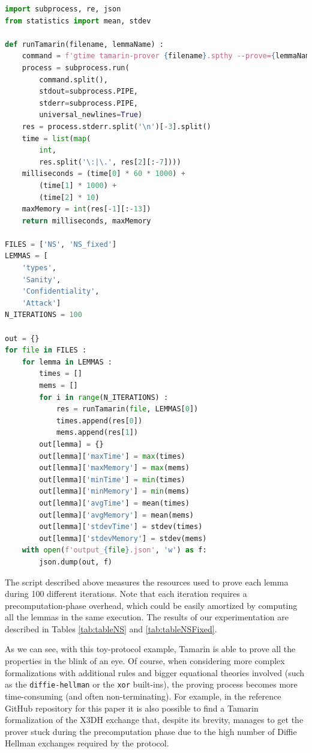 \documentclass[fleqn,10pt]{SelfArx} %
\begin{document}
\begin{lstlisting}[language=Python]
import subprocess, re, json
from statistics import mean, stdev

def runTamarin(filename, lemmaName) :
    command = f'gtime tamarin-prover {filename}.spthy --prove={lemmaName}'
    process = subprocess.run(
        command.split(),
        stdout=subprocess.PIPE,
        stderr=subprocess.PIPE,
        universal_newlines=True)
    res = process.stderr.split('\n')[-3].split()
    time = list(map(
        int,
        res.split('\:|\.', res[2][:-7])))
    milliseconds = (time[0] * 60 * 1000) +
        (time[1] * 1000) +
        (time[2] * 10)
    maxMemory = int(res[-1][:-13])
    return milliseconds, maxMemory

FILES = ['NS', 'NS_fixed']
LEMMAS = [
    'types',
    'Sanity',
    'Confidentiality',
    'Attack']
N_ITERATIONS = 100

out = {}
for file in FILES :
    for lemma in LEMMAS :
        times = []
        mems = []
        for i in range(N_ITERATIONS) :
            res = runTamarin(file, LEMMAS[0])
            times.append(res[0])
            mems.append(res[1])
        out[lemma] = {}
        out[lemma]['maxTime'] = max(times)
        out[lemma]['maxMemory'] = max(mems)
        out[lemma]['minTime'] = min(times)
        out[lemma]['minMemory'] = min(mems)
        out[lemma]['avgTime'] = mean(times)
        out[lemma]['avgMemory'] = mean(mems)
        out[lemma]['stdevTime'] = stdev(times)
        out[lemma]['stdevMemory'] = stdev(mems)
    with open(f'output_{file}.json', 'w') as f:
        json.dump(out, f)
\end{lstlisting}

The script described above measures the resources used to prove each lemma during 100 different iterations. Note that each iteration requires a precomputation-phase overhead, which could be easily amortized by computing all the lemmas in the same execution. The results of our experimentation are described in Tables \ref{tab:tableNS} and \ref{tab:tableNSFixed}.

As we can see, with this toy-protocol example, Tamarin is able to prove all the properties in the blink of an eye. Of course, when considering more complex formalizations with additional rules and bigger equational theories involved (such as the \lstinline|diffie-hellman| or the \lstinline|xor| built-ins), the proving process becomes more time-consuming (and often non-terminating). For example, in the reference GitHub repository \cite{github} for this paper it is also possible to find a Tamarin formalization of the X3DH exchange \cite{x3dh} that, despite its brevity, manages to get the prover stuck during the precomputation phase due to the high number of Diffie Hellman exchanges required by the protocol.
\end{document}
